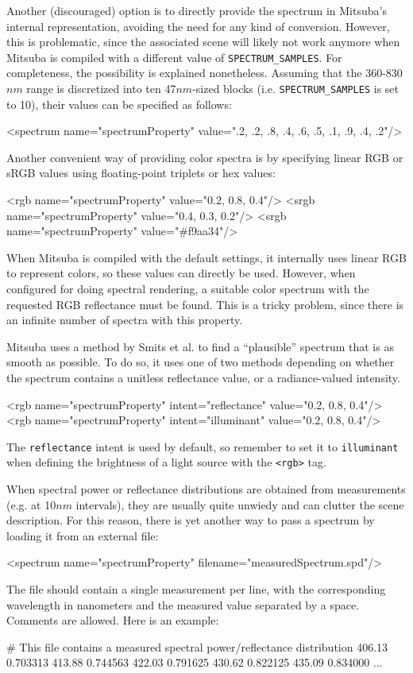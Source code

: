 Another (discouraged) option is to directly provide the spectrum in Mitsuba's
internal representation, avoiding the need for any kind of conversion.
However, this is problematic, since the associated scene will likely not work
anymore when Mitsuba is compiled with a different value of
\texttt{SPECTRUM\_SAMPLES}.
For completeness, the possibility is explained nonetheless. Assuming that
the 360-830$nm$ range is discretized into ten 47$nm$-sized blocks
(i.e. \texttt{SPECTRUM\_SAMPLES} is set to 10), their values can be specified
as follows:
\begin{xml}
<spectrum name="spectrumProperty" value=".2, .2, .8, .4, .6, .5, .1, .9, .4, .2"/>
\end{xml}

Another convenient way of providing color spectra is by specifying linear RGB
or sRGB values using floating-point triplets or hex values:
\begin{xml}
<rgb name="spectrumProperty" value="0.2, 0.8, 0.4"/>
<srgb name="spectrumProperty" value="0.4, 0.3, 0.2"/>
<srgb name="spectrumProperty" value="#f9aa34"/>
\end{xml}
When Mitsuba is compiled with the default settings, it internally uses
linear RGB to represent colors, so these values can directly be used.
However, when configured for doing spectral rendering, a suitable color
spectrum with the requested RGB reflectance must be found. This is a tricky
problem, since there is an infinite number of spectra with this property.

Mitsuba uses a method by Smits et al. \cite{Smits2005RGB} to find a
``plausible'' spectrum that is as smooth as possible. To do so, it uses
one of two methods depending on whether the spectrum contains a
unitless reflectance value, or a radiance-valued intensity.
\begin{xml}
<rgb name="spectrumProperty" intent="reflectance" value="0.2, 0.8, 0.4"/>
<rgb name="spectrumProperty" intent="illuminant" value="0.2, 0.8, 0.4"/>
\end{xml}
The \texttt{reflectance} intent is used by default, so remember to
set it to \texttt{illuminant} when defining the brightness of a
light source with the \texttt{<rgb>} tag.

When spectral power or reflectance distributions are obtained from measurements
(e.g. at 10$nm$ intervals), they are usually quite unwiedy and can clutter
the scene description. For this reason, there is yet another way to pass
a spectrum by loading it from an external file:
\begin{xml}
<spectrum name="spectrumProperty" filename="measuredSpectrum.spd"/>
\end{xml}
The file should contain a single measurement per line, with the corresponding
wavelength in nanometers and the measured value separated by a space. Comments
are allowed. Here is an example:
\begin{xml}
# This file contains a measured spectral power/reflectance distribution
406.13 0.703313
413.88 0.744563
422.03 0.791625
430.62 0.822125
435.09 0.834000
...
\end{xml}

